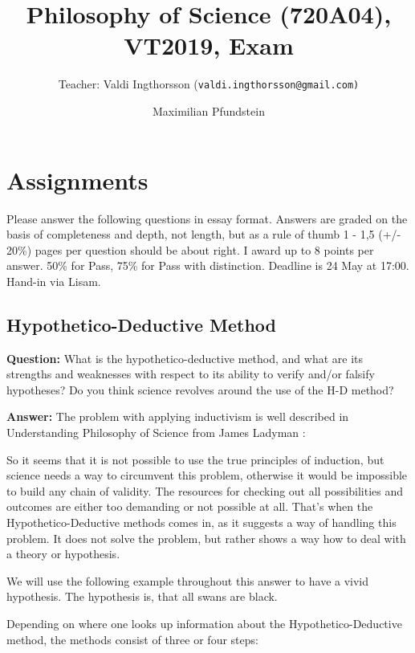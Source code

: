\documentclass[11pt]{scrartcl}
\title{Philosophy of Science (720A04), VT2019, Exam}
\subtitle{Teacher: Valdi Ingthorsson (\texttt{valdi.ingthorsson@gmail.com)}}
\author{Maximilian Pfundstein}
\begin{document}
\maketitle

\tableofcontents

\newpage

\section{Assignments}

Please answer the following questions in essay format. Answers are graded on the basis of completeness and depth, not length, but as a rule of thumb 1 - 1,5 (+/- 20\%) pages per question should be about right. I award up to 8 points per answer. 50\% for Pass, 75\% for Pass with distinction. Deadline is 24 May at 17:00. Hand-in via Lisam.

\subsection{Hypothetico-Deductive Method}

\textbf{Question:} What is the hypothetico-deductive method, and what are its strengths and weaknesses with respect to its ability to verify and/or falsify hypotheses? Do you think science revolves around the use of the H-D method?

\bigbreak

\textbf{Answer:} The problem with applying inductivism is well described in Understanding Philosophy of Science from James Ladyman \cite[p. 40]{ladyman}: 

So it seems that it is not possible to use the true principles of induction, but science needs a way to circumvent this problem, otherwise it would be impossible to build any chain of validity. The resources for checking out all possibilities and outcomes are either too demanding or not possible at all. That's when the Hypothetico-Deductive methods comes in, as it suggests a way of handling this problem. It does not solve the problem, but rather shows a way how to deal with a theory or hypothesis.

We will use the following example throughout this answer to have a vivid hypothesis. The hypothesis is, that all swans are black.

Depending on where one looks up information about the Hypothetico-Deductive method, the methods consist of three or four steps:
\end{document}
